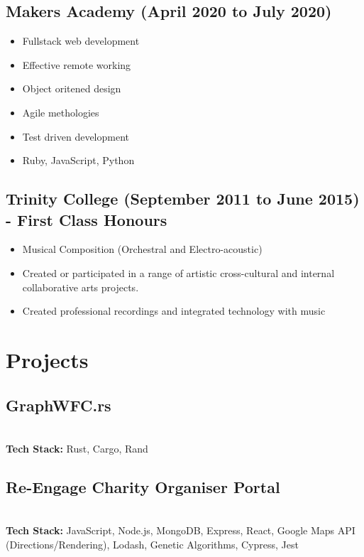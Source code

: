\documentclass[12pt]{IEEEtran}
\begin{document}
\subsection*{Makers Academy (April 2020 to July 2020)}

\begin{itemize}
\item Fullstack web development
\item Effective remote working
\item Object oritened design
\item Agile methologies
\item Test driven development
\item Ruby, JavaScript, Python
\end{itemize}

\subsection*{Trinity College (September 2011 to June 2015) - First Class Honours}
\begin{itemize}
\item Musical Composition (Orchestral and Electro-acoustic)
\item Created or participated in a range of artistic cross-cultural and internal collaborative arts projects.
\item Created professional recordings and integrated technology with music
\end{itemize}

\vskip 1in
\lipsum[1-2]
\vfill\null
\columnbreak

\section*{\textbf{Projects}}
\subsection*{GraphWFC.rs}
 \\[5pt]
\textbf{Tech Stack:} Rust, Cargo, Rand

\subsection*{Re-Engage Charity Organiser Portal}
 \\[5pt]
\textbf{Tech Stack:} JavaScript, Node.js, MongoDB, Express, React, Google Maps API (Directions/Rendering), Lodash, Genetic Algorithms, Cypress, Jest
\end{document}
